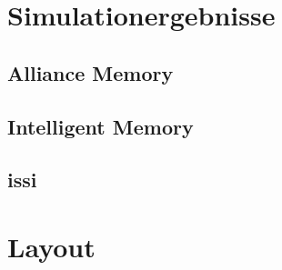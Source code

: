 \chapter{Simulationergebnisse}

\section{Alliance Memory}
\label{app:alliance}


\section{Intelligent Memory}
\label{app:intelligent}


\section{\gls{issi}}
\label{app:issi}


\chapter{Layout}
\label{app:layout}
